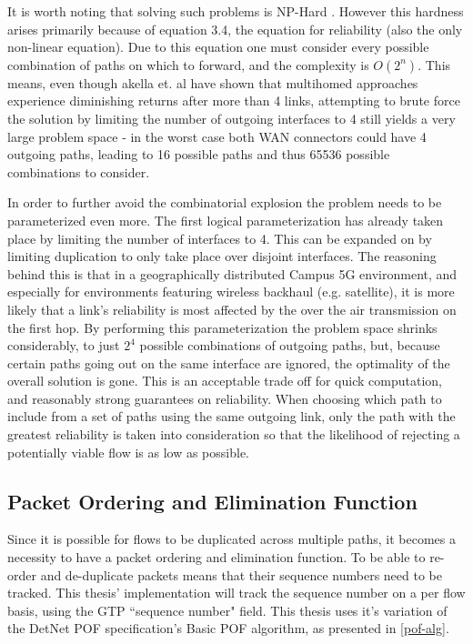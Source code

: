 It is worth noting that solving such problems is NP-Hard \cite{krentel1986complexity, }. However this hardness arises primarily because of equation 3.4, the equation for reliability (also the only non-linear equation). Due to this equation one must consider every possible combination of paths on which to forward, and the complexity is $O(2^n)$. This means, even though akella et. al \cite{akella2003measurement} have shown that multihomed approaches experience diminishing returns after more than 4 links, attempting to brute force the solution by limiting the number of outgoing interfaces to 4 still yields a very large problem space - in the worst case both WAN connectors could have 4 outgoing paths, leading to 16 possible paths and thus 65536 possible combinations to consider.

In order to further avoid the combinatorial explosion the problem needs to be parameterized even more. The first logical parameterization has already taken place by limiting the number of interfaces to 4. This can be expanded on by limiting duplication to only take place over disjoint interfaces. The reasoning behind this is that in a geographically distributed Campus 5G environment, and especially for environments featuring wireless backhaul (e.g. satellite), it is more likely that a link's reliability is most affected by the over the air transmission on the first hop. By performing this parameterization the problem space shrinks considerably, to just $2^4$ possible combinations of outgoing paths, but, because certain paths going out on the same interface are ignored, the optimality of the overall solution is gone. This is an acceptable trade off for quick computation, and reasonably strong guarantees on reliability. When choosing which path to include from a set of paths using the same outgoing link, only the path with the greatest reliability is taken into consideration so that the likelihood of rejecting a potentially viable flow is as low as possible.

\subsection{Packet Ordering and Elimination Function}

Since it is possible for flows to be duplicated across multiple paths, it becomes a necessity to have a packet ordering and elimination function. To be able to re-order and de-duplicate packets means that their sequence numbers need to be tracked. This thesis' implementation will track the sequence number on a per flow basis, using the GTP “sequence number" field. This thesis uses it's variation of the DetNet POF specification's Basic POF algorithm, as presented in \ref{pof-alg}.

